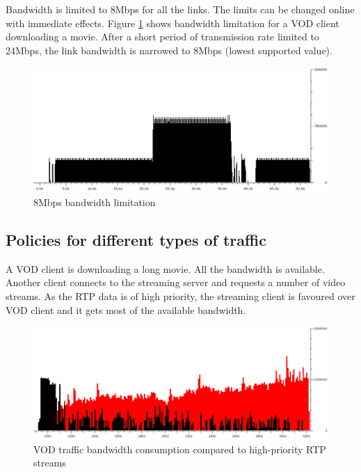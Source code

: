 \documentclass[11pt]{book}
\begin{document}
        Bandwidth is limited to 8Mbps for all the links. The limits can be changed online with immediate effects. Figure
        \ref{fig:uc:limit} shows bandwidth limitation for a VOD client downloading a movie. After a short period of
        transmission rate limited to 24Mbps, the link bandwidth is narrowed to 8Mbps (lowest supported value).

        \begin{figure}[H]
          \begin{center}
            \includegraphics[width=.7\textwidth]{img/test-case/limit.png}
          \end{center}

          \caption{8Mbps bandwidth limitation}
          \label{fig:uc:limit}
        \end{figure}


      \subsection{Policies for different types of traffic}
      \label{sub:uc:traffic}

        A VOD client is downloading a long movie. All the bandwidth is available. Another client connects to the
        streaming server and requests a number of video streams. As the RTP data is of high priority, the streaming
        client is favoured over VOD client and it gets most of the available bandwidth.

        \begin{figure}[H]
          \begin{center}
            \includegraphics[width=.7\textwidth]{img/test-case/vod-rtp.png}
          \end{center}

          \caption{VOD traffic bandwidth consumption compared to high-priority RTP streams}
        \end{figure}
\end{document}

